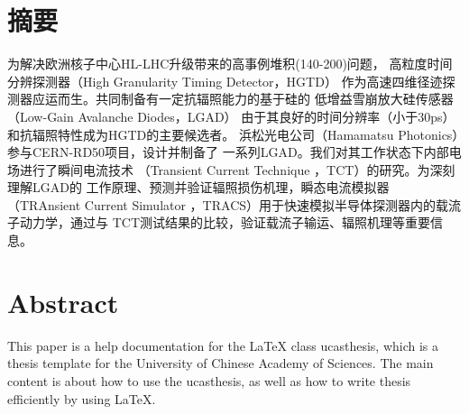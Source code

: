 \maketitle%
\MAKETITLE%
\makedeclaration%
\intobmk\chapter*{摘\quad 要}%
\setcounter{page}{1}%

为解决欧洲核子中心HL-LHC升级带来的高事例堆积(140-200)问题，
高粒度时间分辨探测器（High Granularity Timing Detector，HGTD）
作为高速四维径迹探测器应运而生。共同制备有一定抗辐照能力的基于硅的
低增益雪崩放大硅传感器（Low-Gain Avalanche Diodes，LGAD）
由于其良好的时间分辨率（小于30ps）和抗辐照特性成为HGTD的主要候选者。
浜松光电公司（Hamamatsu Photonics）参与CERN-RD50项目，设计并制备了
一系列LGAD。我们对其工作状态下内部电场进行了瞬间电流技术
（Transient Current Technique ，TCT）的研究。为深刻理解LGAD的
工作原理、预测并验证辐照损伤机理，瞬态电流模拟器（TRAnsient Current 
Simulator ，TRACS）用于快速模拟半导体探测器内的载流子动力学，通过与
TCT测试结果的比较，验证载流子输运、辐照机理等重要信息。

\intobmk\chapter*{Abstract}%

This paper is a help documentation for the \LaTeX{} class ucasthesis, which is  a thesis template for the University of Chinese Academy of Sciences. The main content is about how to use the ucasthesis, as well as how to write thesis efficiently by using \LaTeX{}.

